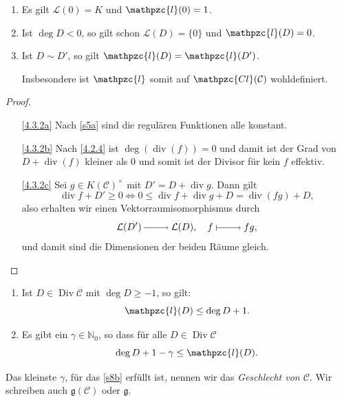 \documentclass[a4paper,12pt,index=toc]{scrbook}
\theoremstyle{keinenummern} %
\def\CC{\mathcal{C}}
\newcommand{\Cl}{\mathpzc{Cl}}
\newcommand{\g}{\mathfrak{g}}
\renewcommand{\L}{\mathcal{L}}
\def\ll{\mathpzc{l}}
\newcommand{\Div}{\operatorname{Div}}
\renewcommand{\div}{\operatorname{div}}
\newcommand{\set}[1]{\ensuremath{\mathbb{#1}}}
\newcommand{\N}{\set{N}}
\begin{document}
\begin{bem}\label{4.3.2}
\begin{enumerate}
\item{} Es gilt $\L(0)=K$ und $\ll(0)=1$.
\item{} Ist $\deg D<0$, so gilt schon $\L(D)=\{0\}$ und $\ll(D)=0$.
\item{} Ist $D\sim D'$, so gilt $\ll(D)=\ll(D')$.

Insbesondere ist $\ll$ somit auf $\Cl(\CC)$ wohldefiniert.
\end{enumerate}\end{bem}

\begin{proof}\begin{enumerate}
\item[\ref{4.3.2a}] Nach \cref{s5a} sind die regulären Funktionen alle konstant.
\item[\ref{4.3.2b}] Nach \cref{4.2.4} ist $\deg(\div (f))=0$ und damit ist der Grad von $D+\div(f)$ kleiner als $0$ und somit ist der Divisor für kein $f$ effektiv.
\item[\ref{4.3.2c}] Sei $g\in K(\CC)^{\times}$ mit $D'=D+\div g$. Dann gilt
\begin{equation*}\div f+D'\geq 0\iff 0\leq \div f+\div g+D=\div(fg)+D,\end{equation*}
also erhalten wir einen Vektorraumisomorphismus durch
\begin{equation*}\L(D')\ra\L(D),\quad f\mapsto fg,\end{equation*}
und damit sind die Dimensionen der beiden Räume gleich.
\end{enumerate}\end{proof}

\begin{satz}[Riemann]\label{satz8}\begin{enumerate}
\item{} Ist $D\in\Div\CC$ mit $\deg D\geq-1$, so gilt:
\begin{equation*}\ll(D)\leq\deg D+1.\end{equation*}
\item{} Es gibt ein $\gamma\in\N_{0}$, so dass für alle $D\in\Div\CC$
\begin{equation*}\deg D+1-\gamma\leq\ll(D).\end{equation*}
\end{enumerate}\end{satz}

\begin{dfn}\label{4.3.3}
Das kleinste $\gamma$, für das \cref{s8b} erfüllt ist, nennen wir das \emph{Geschlecht von $\CC$}. Wir schreiben auch $\g(\CC)$ oder $\g$.
\end{dfn}
\end{document}
